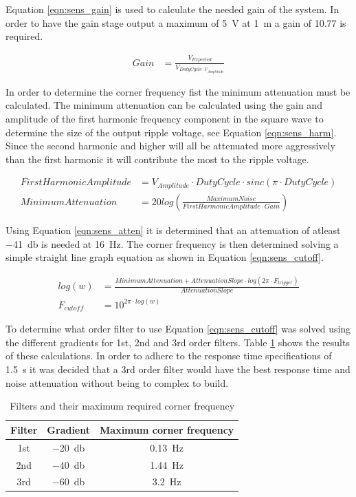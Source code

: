 Equation \ref{eqn:sens_gain} is used to calculate the needed gain of the system. In order to have the gain stage output a maximum of \SI{5}{\volt} at \SI{1}{\meter} a gain of 10.77 is required.

\begin{align}
Gain &= \frac{V_{Expected}}{V_{Duty Cycle \cdot V_{Amplitude}}}\label{eqn:sens_gain}
\end{align}

In order to determine the corner frequency fist the minimum attenuation must be calculated. The minimum attenuation can be calculated using the gain and amplitude of the first harmonic frequency component in the square wave to determine the size of the output ripple voltage, see Equation \ref{eqn:sens_harm}. Since the second harmonic and higher will all be attenuated more aggressively than the first harmonic it will contribute the most to the ripple voltage. 

\begin{align}
First Harmonic Amplitude &= V_{Amplitude} \cdot DutyCycle \cdot sinc(\pi \cdot DutyCycle)\label{eqn:sens_harm}\\
MinimumAttenuation &= 20log(\frac{MaximumNoise}{FirstHarmonicAmplitude \cdot Gain})\label{eqn:sens_atten}
\end{align}

Using Equation \ref{eqn:sens_atten} it is determined that an attenuation of atleast \SI{-41}{\decibel} is needed at \SI{16}{\hertz}. The corner frequency is then determined solving a simple straight line graph equation as shown in Equation \ref{eqn:sens_cutoff}.

\begin{align}
log(w) &= \frac{MinimumAttenuation+AttenuationSlope \cdot log(2\pi \cdot F_{trigger})}{AttenuationSlope}\\
F_{cutoff} &= 10^{2\pi \cdot log(w)}\label{eqn:sens_cutoff}
\end{align}

To determine what order filter to use Equation \ref{eqn:sens_cutoff} was solved using the different gradients for 1st, 2nd and 3rd order filters. Table \ref{tbl:sens_cutoff} shows the results of these calculations. In order to adhere to the response time specifications of \SI{1.5}{\second} it was decided that a 3rd order filter would have the best response time and noise attenuation without being to complex to build. 

\begin{table}
\begin{center}
\begin{tabular}{|c|c|c|}
\hline
Filter & Gradient & Maximum corner frequency\\
\hline
1st & \SI{-20}{\decibel} & \SI{0.13}{\hertz}\\
2nd & \SI{-40}{\decibel} & \SI{1.44}{\hertz}\\
3rd & \SI{-60}{\decibel} & \SI{3.2}{\hertz}\\
\hline
\end{tabular}
\end{center}
\caption{Filters and their maximum required corner frequency}
\label{tbl:sens_cutoff}
\end{table}

